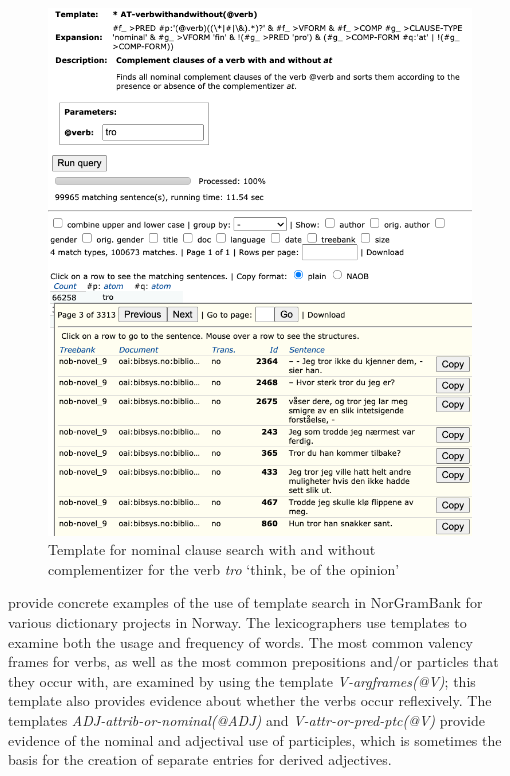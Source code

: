 \documentclass[output=paper,hidelinks]{langscibook}
\begin{document}
\begin{figure}
    \includegraphics[width=\textwidth]{figures/Treebanks/tro-new.png}
    \caption{Template for nominal clause search with and without complementizer for the verb \textit{tro} `think, be of the opinion'}
    \label{fig:tro}
\end{figure}

\citet{RausetEtAl:Words} provide concrete examples of the use of template search in NorGramBank for various dictionary projects in Norway.
The lexicographers use templates to examine both the usage and frequency of words.
The most common valency frames for verbs, as well as the most common prepositions and/or particles that they occur with, are examined by using the template \textit{V-argframes(@V)}; this template also provides evidence about whether the verbs occur reflexively.
The templates \textit{ADJ-attrib-or-nominal(@ADJ)}  and \textit{V-attr-or-pred-ptc(@V)} provide evidence of the nominal and adjectival use of participles, which is sometimes the basis for the creation of separate entries for derived adjectives.
\end{document}
